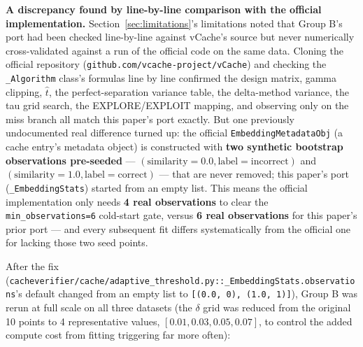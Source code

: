 \documentclass[11pt]{article}
\begin{document}
\textbf{A discrepancy found by line-by-line comparison with the official implementation.} Section~\ref{sec:limitations}'s limitations noted that Group B's port had been checked line-by-line against vCache's source but never numerically cross-validated against a run of the official code on the same data. Cloning the official repository (\texttt{github.\allowbreak{}com/\allowbreak{}vcache-project/\allowbreak{}v\allowbreak{}Cache}) and checking the \texttt{\_\allowbreak{}Algorithm} class's formulas line by line confirmed the design matrix, gamma clipping, $\hat{t}$, the perfect-separation variance table, the delta-method variance, the tau grid search, the EXPLORE/EXPLOIT mapping, and observing only on the miss branch all match this paper's port exactly. But one previously undocumented real difference turned up: the official \texttt{Embedding\allowbreak{}Metadata\allowbreak{}Obj} (a cache entry's metadata object) is constructed with \textbf{two synthetic bootstrap observations pre-seeded} --- $(\text{similarity}=0.0, \text{label}=\text{incorrect})$ and $(\text{similarity}=1.0, \text{label}=\text{correct})$ --- that are never removed; this paper's port (\texttt{\_\allowbreak{}Embedding\allowbreak{}Stats}) started from an empty list. This means the official implementation only needs \textbf{4 real observations} to clear the \texttt{min\_\allowbreak{}observations=6} cold-start gate, versus \textbf{6 real observations} for this paper's prior port --- and every subsequent fit differs systematically from the official one for lacking those two seed points.

After the fix (\texttt{cacheverifier/\allowbreak{}cache/\allowbreak{}adaptive\_\allowbreak{}threshold.\allowbreak{}py:\allowbreak{}:\allowbreak{}\_\allowbreak{}Embedding\allowbreak{}Stats.\allowbreak{}observations}'s default changed from an empty list to \texttt{[(0.\allowbreak{}0, 0), (1.\allowbreak{}0, 1)]}), Group B was rerun at full scale on all three datasets (the $\delta$ grid was reduced from the original 10 points to 4 representative values, $[0.01, 0.03, 0.05, 0.07]$, to control the added compute cost from fitting triggering far more often):
\end{document}
